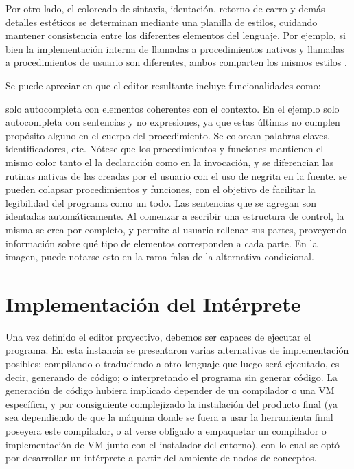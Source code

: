 Por otro lado, el coloreado de sintaxis, identación, retorno de carro y demás detalles estéticos se determinan mediante una planilla de estilos, cuidando mantener consistencia entre los diferentes elementos del lenguaje. Por ejemplo, si bien la implementación interna de llamadas a procedimientos nativos y llamadas a procedimientos de usuario son diferentes, ambos comparten los mismos estilos .


Se puede apreciar en  que el editor resultante incluye funcionalidades como:
\begin{itemize}
 solo autocompleta con elementos coherentes con el contexto. En el ejemplo solo autocompleta con sentencias y no expresiones, ya que estas últimas no cumplen propósito alguno en el cuerpo del procedimiento.
 Se colorean palabras claves, identificadores, etc. Nótese que los procedimientos y funciones mantienen el mismo color tanto el la declaración como en la invocación, y se diferencian las rutinas nativas de las creadas por el usuario con el uso de negrita en la fuente.
 se pueden colapsar procedimientos y funciones, con el objetivo de facilitar la legibilidad del programa como un todo.
 Las sentencias que se agregan son identadas automáticamente.
 Al comenzar a escribir una estructura de control, la misma se crea por completo, y permite al usuario rellenar sus partes, proveyendo información sobre qué tipo de elementos corresponden a cada parte. En la imagen, puede notarse esto en la rama falsa de la alternativa condicional.
\end{itemize}





\section{Implementación del Intérprete}\label{interprete}

Una vez definido el editor proyectivo, debemos ser capaces de ejecutar el programa. En esta instancia se presentaron varias alternativas de implementación posibles: compilando o traduciendo a otro lenguaje que luego será ejecutado, es decir, generando de código; o interpretando el programa sin generar código. La generación de código hubiera implicado depender de un compilador o una VM específica, y por consiguiente complejizado la instalación del producto final (ya sea dependiendo de que la máquina donde se fuera a usar la herramienta final poseyera este compilador, o al verse obligado a empaquetar un compilador o implementación de VM junto con el instalador del entorno), con lo cual se optó por desarrollar un intérprete a partir del ambiente de nodos de conceptos.

